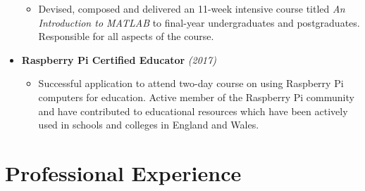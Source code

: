 \documentclass[11pt,a4paper,sans]{moderncv}        %
\begin{document}
\begin{itemize}
{\small{
\begin{itemize}
	\item Devised, composed and delivered an 11-week intensive course titled \textit{An Introduction to MATLAB} to final-year undergraduates and postgraduates. Responsible for all aspects of the course.
\end{itemize}
}}


\vspace{6pt}

\item{\textbf{Raspberry Pi Certified Educator} \textit{(2017)}

\vspace{6pt}

\small{
\begin{itemize}
	\item Successful application to attend two-day course on using Raspberry Pi computers for education. Active member of the Raspberry Pi community and have contributed to educational resources which have been actively used in schools and colleges in England and Wales.
\end{itemize}
}}


\vspace{6pt}




\end{itemize}

\section{Professional Experience}

\vspace{6pt}
\end{document}
